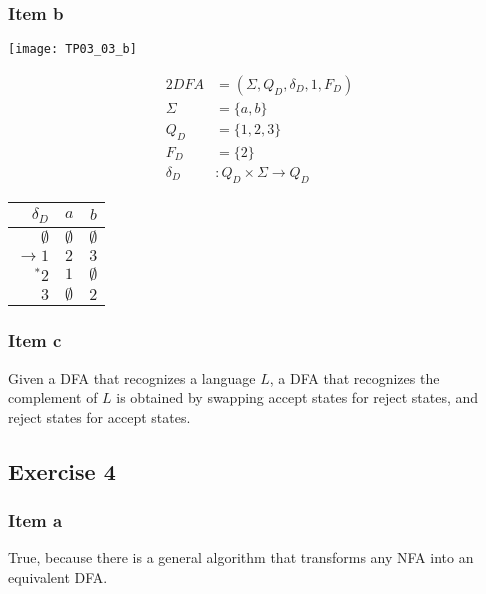 {\subsubsection{Item b}
\begin{center} \texttt{[image: TP03\_03\_b]} \end{center}
\begin{center}
\begin{minipage}[c]{0.30\textwidth}
	\begin{alignat*}{2}
		DFA    &= (\Sigma, Q_D, \delta_D, 1, F_D)\\
		\Sigma &= \{a,b\}\\
		Q_D    &= \{1,2,3\}\\
		F_D    &= \{2\}\\
		\delta_D &\colon Q_D \times \Sigma \rightarrow Q_D
	\end{alignat*}
\end{minipage}%
\begin{minipage}[c]{0.20\textwidth}
	\begin{center}
	\begin{tabular}{ r | c c }
 		$\delta_D$ & $a$ & $b$ \\ \hline
 		$\emptyset    $ & $\emptyset$ & $\emptyset$ \\
 		$\rightarrow 1$ & $2        $ & $3        $ \\  
 		$^*       2$ & $1        $ & $\emptyset$ \\
 		$            3$ & $\emptyset$ & $2        $ \\
	\end{tabular}
	\end{center}
\end{minipage}
\end{center}
\subsubsection{Item c}
\label{subsubsec:03_03_c} Given a DFA that recognizes a language $L$, a DFA that recognizes the complement of $L$ is obtained by swapping accept states for reject states, and reject states for accept states.
\subsection{Exercise 4}
\subsubsection{Item a}
True, because there is a general algorithm that transforms any NFA into an equivalent DFA.
}
